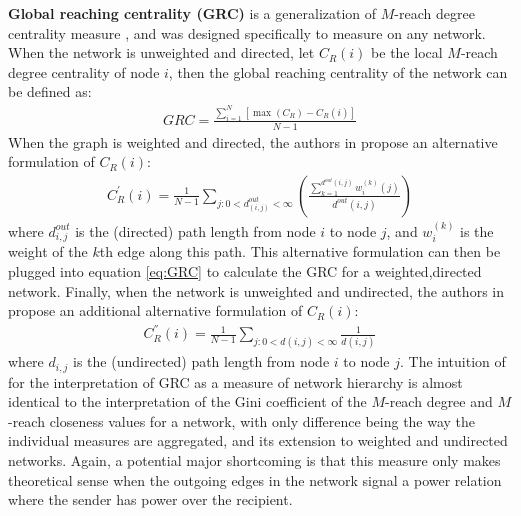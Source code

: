 \documentclass[3p,times]{elsarticle}
\begin{document}
\textbf{Global reaching centrality (GRC)}  is a generalization of $M$-reach degree centrality measure \cite{GRC}, and was designed specifically to measure on any network. When the network is unweighted and directed, let $C_R(i)$ be the local $M$-reach degree centrality of node $i$, then the global reaching centrality of the network can be defined as:
\begin{align}
	\label{eq:GRC}
	GRC=\frac{\sum_{i=1}^N{\left[\max(C_R)-C_R(i)\right]}}{N-1}
\end{align}
When the graph is weighted and directed, the authors in \cite{GRC} propose an alternative formulation of $C_R(i)$:
\begin{align}
	C_{R}^{'}(i)=\frac{1}{N-1}\sum_{j: 0<d^{out}_{(i,j)}<\infty}{( \frac{\sum_{k=1}^{d^{out}(i,j)} {w_{i}^{(k)} (j) } }{d^{out}(i,j)} )}
\end{align}
where $d^{out}_{i,j}$ is the (directed) path length from node $i$ to node $j$, and $w^{(k)}_{i}$ is the weight of the $k$th edge along this path. This alternative formulation can then be plugged into equation \ref{eq:GRC} to calculate the GRC for a weighted,directed network. Finally, when the network is unweighted and undirected, the authors in \cite{GRC} propose an additional alternative formulation of $C_R(i)$:
\begin{align}
	C_{R}^{''}(i)=\frac{1}{N-1}\sum_{j:0<d(i,j)<\infty}{\frac{1}{d(i,j)}}
\end{align}
where $d_{i,j}$ is the (undirected) path length from node $i$ to node $j$. The intuition of for the interpretation of GRC as a measure of network hierarchy is almost identical to the interpretation of the Gini coefficient of the $M$-reach degree and $M$-reach closeness values for a network, with only difference being the way the individual measures are aggregated, and its extension to weighted and undirected networks. Again, a potential major shortcoming is that this measure only makes theoretical sense when the outgoing edges in the network signal a power relation where the sender has power over the recipient. 
\end{document}
